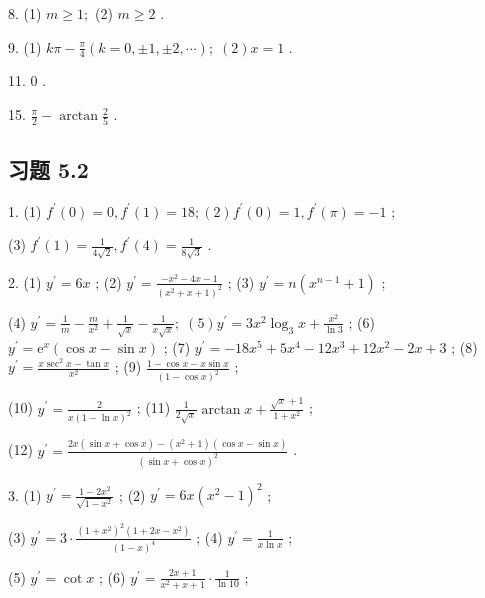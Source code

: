 8. (1) \(m \geq  1;\) (2) \(m \geq  2\) .

9. (1) \({k\pi } - \frac{\pi }{4}\left( {k = 0, \pm  1, \pm  2,\cdots }\right) ;\;\left( 2\right) x = 1\) .

11. 0 .

15. \(\frac{\pi }{2} - \arctan \frac{2}{5}\) .

\subsection{习题 5.2}

1. (1) \({f}^{\prime }\left( 0\right)  = 0,{f}^{\prime }\left( 1\right)  = {18};\left( 2\right) {f}^{\prime }\left( 0\right)  = 1,{f}^{\prime }\left( \pi \right)  =  - 1\) ;

(3) \({f}^{\prime }\left( 1\right)  = \frac{1}{4\sqrt{2}},{f}^{\prime }\left( 4\right)  = \frac{1}{8\sqrt{3}}\) .

2. (1) \({y}^{\prime } = {6x}\) ; (2) \({y}^{\prime } = \frac{-{x}^{2} - {4x} - 1}{{\left( {x}^{2} + x + 1\right) }^{2}}\) ; (3) \({y}^{\prime } = n\left( {{x}^{n - 1} + 1}\right)\) ;

(4) \({y}^{\prime } = \frac{1}{m} - \frac{m}{{x}^{2}} + \frac{1}{\sqrt{x}} - \frac{1}{x\sqrt{x}};\;\left( 5\right) {y}^{\prime } = 3{x}^{2}{\log }_{3}x + \frac{{x}^{2}}{\ln 3}\) ; (6) \({y}^{\prime } = {\mathrm{e}}^{x}\left( {\cos x - \sin x}\right)\) ; (7) \({y}^{\prime } =  - {18}{x}^{5} + 5{x}^{4} - {12}{x}^{3} + {12}{x}^{2} - {2x} + 3\) ; (8) \({y}^{\prime } = \frac{x{\sec }^{2}x - \tan x}{{x}^{2}}\) ; (9) \(\frac{1 - \cos x - x\sin x}{{\left( 1 - \cos x\right) }^{2}}\) ;

(10) \({y}^{\prime } = \frac{2}{x{\left( 1 - \ln x\right) }^{2}}\) ; (11) \(\frac{1}{2\sqrt{x}}\arctan x + \frac{\sqrt{x} + 1}{1 + {x}^{2}}\) ;

(12) \({y}^{\prime } = \frac{{2x}\left( {\sin x + \cos x}\right)  - \left( {{x}^{2} + 1}\right) \left( {\cos x - \sin x}\right) }{{\left( \sin x + \cos x\right) }^{2}}\) .

3. (1) \({y}^{\prime } = \frac{1 - 2{x}^{2}}{\sqrt{1 - {x}^{2}}}\) ; (2) \({y}^{\prime } = {6x}{\left( {x}^{2} - 1\right) }^{2}\) ;

(3) \({y}^{\prime } = 3 \cdot  \frac{{\left( 1 + {x}^{2}\right) }^{2}\left( {1 + {2x} - {x}^{2}}\right) }{{\left( 1 - x\right) }^{4}}\) ; (4) \({y}^{\prime } = \frac{1}{x\ln x}\) ;

(5) \({y}^{\prime } = \cot x\) ; (6) \({y}^{\prime } = \frac{{2x} + 1}{{x}^{2} + x + 1} \cdot  \frac{1}{\ln {10}}\) ;

